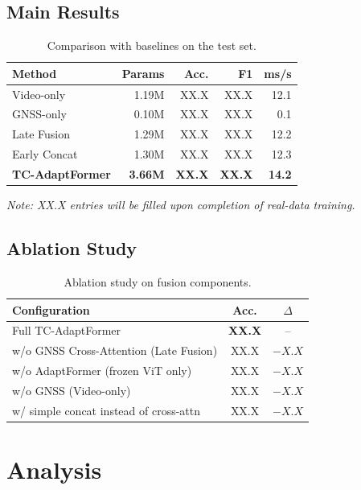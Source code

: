\documentclass[10pt,twocolumn]{article}
\begin{document}
\subsection{Main Results}

\begin{table}[h]
\centering
\caption{Comparison with baselines on the test set.}
\label{tab:main_results}
\begin{tabular}{lrrrr}
\toprule
Method & Params & Acc. & F1 & ms/s \\
\midrule
Video-only & 1.19M & XX.X & XX.X & 12.1 \\
GNSS-only & 0.10M & XX.X & XX.X & \phantom{0}0.1 \\
Late Fusion & 1.29M & XX.X & XX.X & 12.2 \\
Early Concat & 1.30M & XX.X & XX.X & 12.3 \\
\textbf{TC-AdaptFormer} & \textbf{3.66M} & \textbf{XX.X} & \textbf{XX.X} & \textbf{14.2} \\
\bottomrule
\end{tabular}
\end{table}

\noindent\textit{Note: XX.X entries will be filled upon completion of real-data training.}

\subsection{Ablation Study}

\begin{table}[h]
\centering
\caption{Ablation study on fusion components.}
\label{tab:ablation}
\begin{tabular}{lcc}
\toprule
Configuration & Acc. & $\Delta$ \\
\midrule
Full TC-AdaptFormer & \textbf{XX.X} & -- \\
w/o GNSS Cross-Attention (Late Fusion) & XX.X & $-X.X$ \\
w/o AdaptFormer (frozen ViT only) & XX.X & $-X.X$ \\
w/o GNSS (Video-only) & XX.X & $-X.X$ \\
w/ simple concat instead of cross-attn & XX.X & $-X.X$ \\
\bottomrule
\end{tabular}
\end{table}

\section{Analysis}
\end{document}
